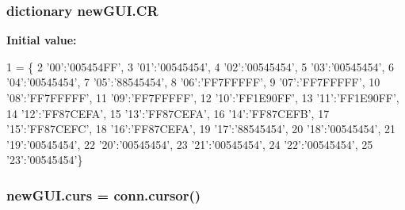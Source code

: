 \subsubsection[{\texorpdfstring{CR}{CR}}]{\setlength{\rightskip}{0pt plus 5cm}dictionary new\+G\+U\+I.\+CR}\hypertarget{namespacenewGUI_a0d1b5c5572fb3279b11bca7a9e927686}{}\label{namespacenewGUI_a0d1b5c5572fb3279b11bca7a9e927686}
{\bfseries Initial value\+:}
\begin{DoxyCode}
1 = \{
2 \textcolor{stringliteral}{'00'}:\textcolor{stringliteral}{'005454FF'},
3 \textcolor{stringliteral}{'01'}:\textcolor{stringliteral}{'00545454'},
4 \textcolor{stringliteral}{'02'}:\textcolor{stringliteral}{'00545454'},
5 \textcolor{stringliteral}{'03'}:\textcolor{stringliteral}{'00545454'},
6 \textcolor{stringliteral}{'04'}:\textcolor{stringliteral}{'00545454'},
7 \textcolor{stringliteral}{'05'}:\textcolor{stringliteral}{'88545454'},
8 \textcolor{stringliteral}{'06'}:\textcolor{stringliteral}{'FF7FFFFF'},
9 \textcolor{stringliteral}{'07'}:\textcolor{stringliteral}{'FF7FFFFF'},
10 \textcolor{stringliteral}{'08'}:\textcolor{stringliteral}{'FF7FFFFF'},
11 \textcolor{stringliteral}{'09'}:\textcolor{stringliteral}{'FF7FFFFF'},
12 \textcolor{stringliteral}{'10'}:\textcolor{stringliteral}{'FF1E90FF'},
13 \textcolor{stringliteral}{'11'}:\textcolor{stringliteral}{'FF1E90FF'},
14 \textcolor{stringliteral}{'12'}:\textcolor{stringliteral}{'FF87CEFA'},
15 \textcolor{stringliteral}{'13'}:\textcolor{stringliteral}{'FF87CEFA'},
16 \textcolor{stringliteral}{'14'}:\textcolor{stringliteral}{'FF87CEFB'},
17 \textcolor{stringliteral}{'15'}:\textcolor{stringliteral}{'FF87CEFC'},
18 \textcolor{stringliteral}{'16'}:\textcolor{stringliteral}{'FF87CEFA'},
19 \textcolor{stringliteral}{'17'}:\textcolor{stringliteral}{'88545454'},
20 \textcolor{stringliteral}{'18'}:\textcolor{stringliteral}{'00545454'},
21 \textcolor{stringliteral}{'19'}:\textcolor{stringliteral}{'00545454'},
22 \textcolor{stringliteral}{'20'}:\textcolor{stringliteral}{'00545454'},
23 \textcolor{stringliteral}{'21'}:\textcolor{stringliteral}{'00545454'},
24 \textcolor{stringliteral}{'22'}:\textcolor{stringliteral}{'00545454'},
25 \textcolor{stringliteral}{'23'}:\textcolor{stringliteral}{'00545454'}\}
\end{DoxyCode}
\subsubsection[{\texorpdfstring{curs}{curs}}]{\setlength{\rightskip}{0pt plus 5cm}new\+G\+U\+I.\+curs = conn.\+cursor()}\hypertarget{namespacenewGUI_a5544cf625f6efca1ade3fecd19cae96b}{}\label{namespacenewGUI_a5544cf625f6efca1ade3fecd19cae96b}
